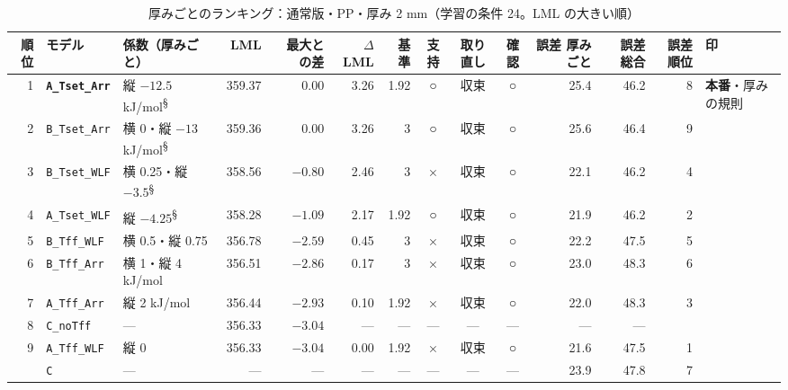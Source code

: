 \documentclass[paper=a4paper,landscape,fontsize=10pt,line_length=62zw,number_of_lines=34]{jlreq}
\let\origtextbf\textbf
\renewcommand{\textbf}[1]{\origtextbf{\gtfamily #1}}   %
\begin{document}
\begin{table}[H]\centering\footnotesize
\caption{厚みごとのランキング：通常版・PP・厚み 2 mm（学習の条件 24。LML の大きい順）}
\begin{tabular}{rlp{11\zw}rrrrccc rrrl}
\toprule
順位 & モデル & 係数（厚みごと） & LML & 最大との差 & $\Delta$LML & 基準 & 支持 & 取り直し & 確認 & 誤差 厚みごと & 誤差 総合 & 誤差順位 & 印 \\
\midrule
1 & \textbf{\texttt{A\_\allowbreak{}Tset\_\allowbreak{}Arr}} & 縦 $-12.5$ kJ/mol\textsuperscript{§} & 359.37 & 0.00 & 3.26 & 1.92 & ○ & 収束 & ○ & 25.4 & 46.2 & 8 & \textbf{本番}・厚みの規則 \\
2 & \texttt{B\_\allowbreak{}Tset\_\allowbreak{}Arr} & 横 0・縦 $-13$ kJ/mol\textsuperscript{§} & 359.36 & 0.00 & 3.26 & 3 & ○ & 収束 & ○ & 25.6 & 46.4 & 9 &  \\
3 & \texttt{B\_\allowbreak{}Tset\_\allowbreak{}WLF} & 横 0.25・縦 $-3.5$\textsuperscript{§} & 358.56 & $-0.80$ & 2.46 & 3 & × & 収束 & ○ & 22.1 & 46.2 & 4 &  \\
4 & \texttt{A\_\allowbreak{}Tset\_\allowbreak{}WLF} & 縦 $-4.25$\textsuperscript{§} & 358.28 & $-1.09$ & 2.17 & 1.92 & ○ & 収束 & ○ & 21.9 & 46.2 & 2 &  \\
5 & \texttt{B\_\allowbreak{}Tff\_\allowbreak{}WLF} & 横 0.5・縦 0.75 & 356.78 & $-2.59$ & 0.45 & 3 & × & 収束 & ○ & 22.2 & 47.5 & 5 &  \\
6 & \texttt{B\_\allowbreak{}Tff\_\allowbreak{}Arr} & 横 1・縦 4 kJ/mol & 356.51 & $-2.86$ & 0.17 & 3 & × & 収束 & ○ & 23.0 & 48.3 & 6 &  \\
7 & \texttt{A\_\allowbreak{}Tff\_\allowbreak{}Arr} & 縦 2 kJ/mol & 356.44 & $-2.93$ & 0.10 & 1.92 & × & 収束 & ○ & 22.0 & 48.3 & 3 &  \\
8 & \texttt{C\_\allowbreak{}noTff} & --- & 356.33 & $-3.04$ & --- & --- & --- & --- & --- & --- & --- &  &  \\
9 & \texttt{A\_\allowbreak{}Tff\_\allowbreak{}WLF} & 縦 0 & 356.33 & $-3.04$ & 0.00 & 1.92 & × & 収束 & ○ & 21.6 & 47.5 & 1 &  \\
 & \texttt{C} & --- & --- & --- & --- & --- & --- & --- & --- & 23.9 & 47.8 & 7 &  \\
\bottomrule
\end{tabular}
\end{table}
\end{document}
